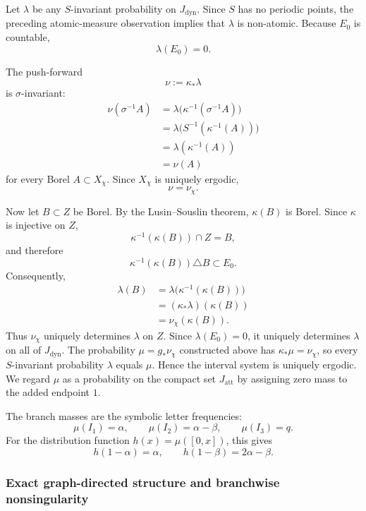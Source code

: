 \documentclass[11pt]{amsart}
\theoremstyle{plain}
\theoremstyle{definition}
\theoremstyle{remark}
\begin{document}
Let \(\lambda\) be any \(S\)-invariant probability on
\(J_{\mathrm{dyn}}\). Since \(S\) has no periodic points, the preceding
atomic-measure observation implies that \(\lambda\) is non-atomic. Because
\(E_0\) is countable,
\[
        \lambda(E_0)=0.
\]

The push-forward
\[
        \nu:=\kappa_*\lambda
\]
is \(\sigma\)-invariant:
\[
\begin{aligned}
\nu(\sigma^{-1}A)
&=
\lambda\bigl(\kappa^{-1}(\sigma^{-1}A)\bigr)\\
&=
\lambda\bigl(S^{-1}(\kappa^{-1}(A))\bigr)\\
&=
\lambda(\kappa^{-1}(A))\\
&=
\nu(A)
\end{aligned}
\]
for every Borel \(A\subset X_\chi\). Since \(X_\chi\) is uniquely
ergodic,
\[
        \nu=\nu_\chi.
\]

Now let \(B\subset Z\) be Borel. By the Lusin--Souslin theorem,
\(\kappa(B)\) is Borel. Since \(\kappa\) is injective on \(Z\),
\[
        \kappa^{-1}(\kappa(B))\cap Z=B,
\]
and therefore
\[
        \kappa^{-1}(\kappa(B))\triangle B
        \subset E_0.
\]
Consequently,
\[
\begin{aligned}
\lambda(B)
&=
\lambda\bigl(\kappa^{-1}(\kappa(B))\bigr)\\
&=
(\kappa_*\lambda)(\kappa(B))\\
&=
\nu_\chi(\kappa(B)).
\end{aligned}
\]
Thus \(\nu_\chi\) uniquely determines \(\lambda\) on \(Z\). Since
\(\lambda(E_0)=0\), it uniquely determines \(\lambda\) on all of
\(J_{\mathrm{dyn}}\). The probability \(\mu=g_*\nu_\chi\) constructed
above has \(\kappa_*\mu=\nu_\chi\), so every \(S\)-invariant probability
\(\lambda\) equals \(\mu\). Hence the interval system is uniquely
ergodic. We regard \(\mu\) as a probability on the compact set \(J_{\mathrm{att}}\) by
assigning zero mass to the added endpoint \(1\).


The branch masses are the symbolic letter frequencies:
\[
\mu(I_1)=\alpha,
\qquad
\mu(I_2)=\alpha-\beta,
\qquad
\mu(I_3)=q.
\tag{8.8}
\label{eq:BT-branch-masses}
\]
For the distribution function \(h(x)=\mu([0,x])\), this gives
\[
        h(1-\alpha)=\alpha,
        \qquad
        h(1-\beta)=2\alpha-\beta.
\tag{8.9}
\label{eq:BT-branch-cuts}
\]

\subsubsection{Exact graph-directed structure and branchwise nonsingularity}
\end{document}
